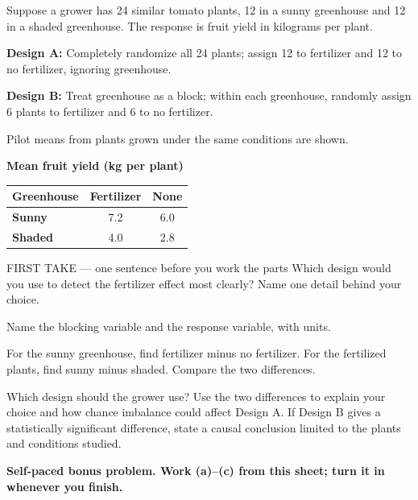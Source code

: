 \documentclass[14pt]{extarticle}
\begin{document}
\pagestyle{empty}


\noindent\begin{minipage}[t]{0.57\linewidth}
\vspace{0pt}
Suppose a grower has 24 similar tomato plants, 12 in a sunny greenhouse and 12 in a shaded greenhouse. The response is fruit yield in kilograms per plant.\par\smallskip \textbf{Design A:} Completely randomize all 24 plants; assign 12 to fertilizer and 12 to no fertilizer, ignoring greenhouse.\par \textbf{Design B:} Treat greenhouse as a block; within each greenhouse, randomly assign 6 plants to fertilizer and 6 to no fertilizer.\par\smallskip Pilot means from plants grown under the same conditions are shown.\par
\end{minipage}\hfill
\begin{minipage}[t]{0.40\linewidth}
\vspace{0pt}
\begin{center}
\textbf{Mean fruit yield (kg per plant)}\par\smallskip
\begin{tabular}{|l|c|c|}
\hline
\textbf{Greenhouse} & \textbf{Fertilizer} & \textbf{None} \\ \hline
\textbf{Sunny} & 7.2 & 6.0 \\ \hline
\textbf{Shaded} & 4.0 & 2.8 \\ \hline
\end{tabular}
\end{center}
\end{minipage}

\begin{firsttakebox}{FIRST TAKE --- one sentence before you work the parts}
Which design would you use to detect the fertilizer effect most clearly? Name one detail behind your choice.
\end{firsttakebox}

\begin{description}[leftmargin=1.15in, labelwidth=1in, itemsep=2pt, topsep=2pt]
  \item[\dokbadge{1}~(a)] Name the blocking variable and the response variable, with units.
  \item[\dokbadge{2}~(b)] For the sunny greenhouse, find fertilizer minus no fertilizer. For the fertilized plants, find sunny minus shaded. Compare the two differences.
  \item[\dokbadge{3}~(c)] Which design should the grower use? Use the two differences to explain your choice and how chance imbalance could affect Design A. If Design B gives a statistically significant difference, state a causal conclusion limited to the plants and conditions studied.
\end{description}

\vfill
\textbf{Self-paced bonus problem. Work (a)--(c) from this sheet; turn it in whenever you finish.}
\end{document}
